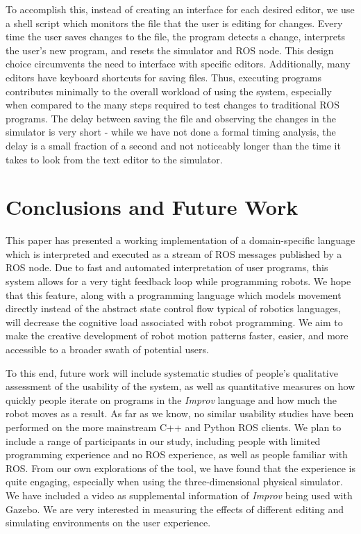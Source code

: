 \documentclass[sigchi-a]{acmart}
\begin{document}
To accomplish this, instead of creating an interface for each desired
editor, we use a shell script which monitors the file that the user is
editing for changes. Every time the user saves changes to the file, the
program detects a change, interprets the user's new program, and resets
the simulator and ROS node. This design choice circumvents the need to
interface with specific editors. Additionally, many editors have
keyboard shortcuts for saving files. Thus, executing programs
contributes minimally to the overall workload of using the system,
especially when compared to the many steps required to test changes to
traditional ROS programs. The delay between saving the file and observing the
changes in the simulator is very short - while we have not done a formal timing
analysis, the delay is a small fraction of a second and not noticeably longer than the
time it takes to look from the text editor to the simulator.

\section{Conclusions and Future
Work}\label{conclusions-and-future-work}

This paper has presented a working implementation of a domain-specific
language which is interpreted and executed as a stream of ROS messages published
by a ROS node. Due to fast and automated interpretation of user programs, this system allows for a very tight
feedback loop while programming robots. We hope that this feature,
along with a programming language which models movement directly instead of the
abstract state control flow typical of robotics languages, will decrease the
cognitive load associated with robot programming. We aim to make the creative
development of robot motion patterns faster, easier, and more accessible to a
broader swath of potential users.


To this end, future work will include systematic studies of people's qualitative
assessment of the usability of the system, as well as quantitative measures on
how quickly people iterate on programs in the \emph{Improv} language and how much the
robot moves as a result. As far as we know, no similar usability studies have
been performed on the more mainstream C++ and Python ROS clients. We plan to
include a range of participants in our study, including people with limited
programming experience and no ROS experience, as well as people familiar with
ROS. From our own explorations of the tool, we have found that the
experience is quite engaging, especially when using the three-dimensional
physical simulator. We have included a video as supplemental information of
\emph{Improv} being used with Gazebo. We are very interested in measuring the effects of different
editing and simulating environments on the user experience.
\end{document}
